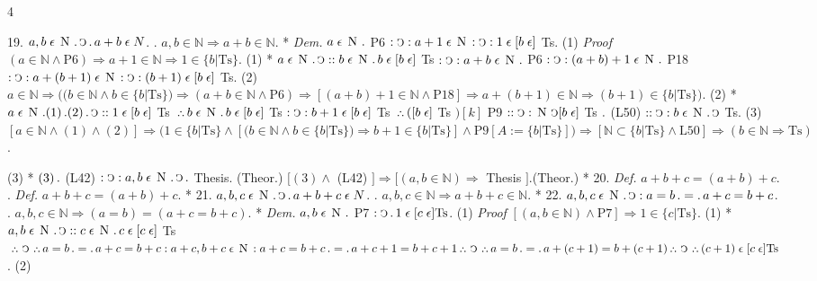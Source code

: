 \documentclass{book}
\newcommand{\s}{\switchcolumn} %
\newcommand{\C}{\mathop{\sbox0{$\displaystyle$$\reflectbox{C}$} %
\raisebox{-\height+\ht0-0.05cm}[\ht0][\dp0]{\scalebox{0.8}[0.8]{\copy0}}}\displaylimits} %
\newcommand{\p}{\mathop{\sbox0{$\displaystyle$$.$}
\raisebox{-\height+\ht0}[\ht0][\dp0]{\scalebox{1}[1]{\copy0}}}\displaylimits} %
\newcommand{\pppNoSpace}{\leavevmode\lower0ex\hbox{.}\kern-0.1em\raise0.7ex\hbox{.}\kern-0.1em\lower0ex\hbox{.}} %
\newcommand{\ppp}{\thinspace \pppNoSpace\thinspace} %
\newcommand{\smallIn}{\ensuremath{\mathrel{\epsilon}}}
\newcommand{\N}{\mathop{\thinspace \text{N} \thinspace}}
\renewcommand{\rightarrow}{\Rightarrow}
\newenvironment{translateFourCol}[4]
               { %
                 \setcolumnwidth{#1\fill/1em, #2\fill/\columnsep, #3\fill/1em, #4\fill}
                 \begin{paracol}{4}
                 \newcommand{\LAT}{\switchcolumn[0]*}
                 \newcommand{\ENG}{\switchcolumn[2]}
               }
               { %
                 \let\ENG\undefined
                 \let\LAT\undefined
                 \end{paracol}
               }
\begin{document}
\begin{translateFourCol}{0.08}{0.42}{0.08}{0.42}
\raggedright
19. \s $a, b \smallIn \N \p \C \p a + b \smallIn N$. 
\ENG
19. \s $a, b \in \mathbb{N} \rightarrow a + b \in \mathbb{N}$.
\LAT
\emph{Dem.} \s $a \smallIn \N \p$ P6 $: \C : a + 1 \smallIn \N : \C : 1 \smallIn [b \smallIn]$ Ts. \hfill (1)
\ENG
\emph{Proof} \s $(a \in \mathbb{N} \wedge \text{P6} ) \rightarrow a + 1 \in \mathbb{N} \rightarrow 1 \in \{ b | \text{Ts} \}$. \hfill (1)
\LAT
\s $a \smallIn \N \p \C :: b \smallIn \N \p b \smallIn [b \smallIn]$ Ts $: \C : a + b \smallIn \N \p$ P6 $: \C : (a + b) + 1 \smallIn \N \p$ P18 $: \C : a + (b + 1) \smallIn \N : \C : (b + 1) \smallIn [b \smallIn]$ Ts. \hfill (2)
\ENG
\s $a \in \mathbb{N} \rightarrow \Big( (b \in \mathbb{N} \wedge b \in \{ b | \text{Ts} \}) \rightarrow (a + b \in \mathbb{N} \wedge \text{P6} ) \rightarrow [(a + b) + 1 \in \mathbb{N} \wedge \text{P18} ] \rightarrow a + (b + 1) \in \mathbb{N} \rightarrow (b + 1) \in \{ b | \text{Ts} \} \Big)$. \hfill (2)
\LAT
\s $a \smallIn \N \p (1) \p (2) \p \C : : 1 \smallIn [b \smallIn]$ Ts $\ppp b \smallIn \N \p b \smallIn [b \smallIn]$ Ts $: \C : b + 1 \smallIn [b \smallIn]$ Ts $\ppp ([b \smallIn]$ Ts $) [k]$ P9 $: : \C : \N \C [b \smallIn]$ Ts $\p$ (L50) $:: \C : b \smallIn \N \p \C$ Ts. \hfill (3)
\ENG
\s $[a \in \mathbb{N} \wedge (1) \wedge (2)] \rightarrow \Big( 1 \in \{b | \text{Ts} \} \wedge [(b \in \mathbb{N} \wedge b \in \{b | \text{Ts} \}) \rightarrow b + 1 \in \{ b | \text{Ts} \}] \wedge \text{P9}[A:=\{b |\text{Ts}\}] \Big) \rightarrow [\mathbb{N} \subset \{b | \text{Ts} \} \wedge \text{L50}] \rightarrow (b \in \mathbb{N} \rightarrow \text{Ts})$. \strut\hfill (3)
\LAT
\s $(3) \p$ (L42) $: \C : a,b \smallIn \N \p \C \p$ Thesis. \hfill (Theor.)
\ENG
\s $[(3) \wedge $ (L42) $] \rightarrow [(a,b \in \mathbb{N}) \rightarrow $ Thesis $]$.\hfill (Theor.)
\LAT
20. \emph{Def.} \s $a + b + c = (a + b) + c$. \s
\ENG
20. \emph{Def.} \s $a + b + c = (a + b) + c$. \s
\LAT
21. \s $a,b,c \smallIn \N \p \C \p a + b + c \smallIn N$. \s
\ENG
21. \s $a,b,c \in \mathbb{N} \rightarrow a + b + c \in \mathbb{N}$. \s
\LAT
22. \s $a,b,c \smallIn \N \p \C : a = b \p = \p a + c = b + c$. \s
\ENG
22. \s $a,b,c \in \mathbb{N} \rightarrow (a = b) = (a + c = b + c)$. \s
\LAT
\emph{Dem.} \s $a,b \smallIn \N \p$ P7 $: \C \p 1 \smallIn [c \smallIn] \text{Ts}$. \hfill (1)
\ENG
\emph{Proof} \s $[(a,b \in \mathbb{N}) \wedge \text{P7}] \rightarrow 1 \in \{c | \text{Ts} \}$. \hfill (1)
\LAT
\s $a,b \smallIn \N \p \C :: c \smallIn \N \p c \smallIn [c \smallIn]$ Ts $\ppp \C \ppp a = b \p = \p a + c = b + c : a + c , b + c \smallIn \N : a + c = b + c \p = \p a + c + 1 = b + c + 1 \ppp \C \ppp a = b \p = \p a + (c + 1) = b + (c + 1) \ppp \C \ppp (c + 1) \smallIn [c \smallIn] \text{Ts}$. \hfill (2)

\end{translateFourCol}
\end{document}
